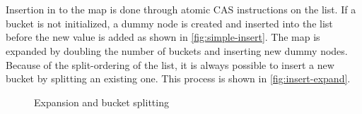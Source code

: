 \documentclass{uit-thesis}
\begin{document}
\\\\
Insertion in to the map is done through atomic CAS instructions on the list. If a bucket is not initialized, a dummy node is created and inserted into the list before the new value is added as shown in \autoref{fig:simple-insert}. The map is expanded by doubling the number of buckets and inserting new dummy nodes. Because of the split-ordering of the list, it is always possible to insert a new bucket by splitting an existing one. This process is shown in \autoref{fig:insert-expand}.
\begin{figure}
    \centering
    \newline
    \newline
    \newline
\caption{Expansion and bucket splitting}    
\label{fig:insert-expand}
\end{figure}
\end{document}
